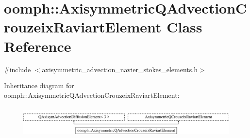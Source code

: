 \hypertarget{classoomph_1_1AxisymmetricQAdvectionCrouzeixRaviartElement}{}\section{oomph\+:\+:Axisymmetric\+Q\+Advection\+Crouzeix\+Raviart\+Element Class Reference}
\label{classoomph_1_1AxisymmetricQAdvectionCrouzeixRaviartElement}


{\ttfamily \#include $<$axisymmetric\+\_\+advection\+\_\+navier\+\_\+stokes\+\_\+elements.\+h$>$}

Inheritance diagram for oomph\+:\+:Axisymmetric\+Q\+Advection\+Crouzeix\+Raviart\+Element\+:\begin{figure}[H]
\begin{center}
\leavevmode
\includegraphics[height=1.656805cm]{classoomph_1_1AxisymmetricQAdvectionCrouzeixRaviartElement}
\end{center}
\end{figure}
